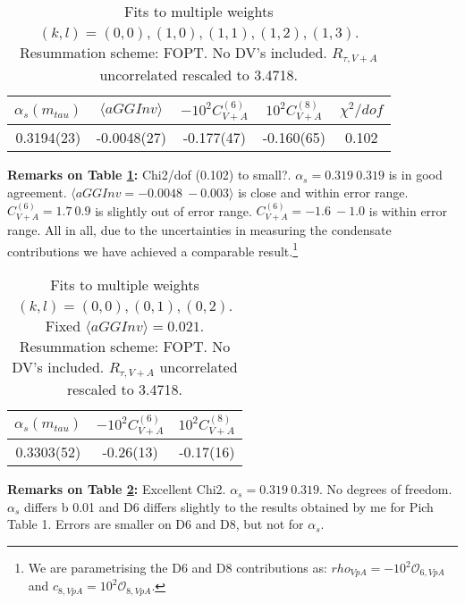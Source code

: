 \documentclass[12pt]{article}
\begin{document}
\begin{table}
  \centering
  \begin{tabular}{ | c c c c c | }
    \hline
    $\alpha_s(m_{tau})$ & $\langle aGGInv \rangle$ & $-10^2 C_{V+A}^{(6)}$ & $10^2 C_{V+A}^{(8)}$ & $\chi^2/dof$ \\ 
    \hline
    0.3194(23) & -0.0048(27) & -0.177(47) & -0.160(65) & 0.102 \\ 
    \hline
  \end{tabular}
  \caption{
    Fits to multiple weights $(k, l) = {(0,0), (1,0), (1,1), (1,2), (1,3)}$.
    Resummation scheme: FOPT. No DV's included.
    $R_{\tau, V+A}$ uncorrelated rescaled to 3.4718.
  }
  \label{table:pich2016Table1}
\end{table}
\textbf{Remarks on Table \ref{table:pich2016Table1}:} Chi2/dof (0.102) to small?. $\alpha_s
= 0.319 ~ 0.319$
is in good agreement. $\langle aGGInv = -0.0048 ~ -0.003 \rangle$ is close and
within error range. $C_{V+A}^{(6)} = 1.7 ~ 0.9$ is slightly out of error range.
$C_{V+A}^{(6)} = -1.6 ~ -1.0$ is within error range. All in all, due to the
uncertainties in measuring the condensate contributions we have achieved a
comparable result.\footnote{We are parametrising the D6 and D8 contributions as: $rho_{VpA} = - 10^2 \mathcal{O}_{6,
      VpA}$ and $c_{8, VpA} = 10^2 \mathcal{O}_{8, VpA}$.}

\begin{table}
  \centering
  \begin{tabular}{ | c c c | }
    \hline
    $\alpha_s(m_{tau})$ & $-10^2 C_{V+A}^{(6)}$ & $10^2 C_{V+A}^{(8)}$ \\ 
    \hline
    0.3303(52) & -0.26(13) & -0.17(16) \\ 
    \hline
  \end{tabular}
  \caption{
    Fits to multiple weights $(k, l) = {(0,0), (0,1), (0,2)}$.
    Fixed $\langle  aGGInv \rangle = 0.021$.
    Resummation scheme: FOPT. No DV's included.
    $R_{\tau, V+A}$ uncorrelated rescaled to 3.4718.
  }
  \label{table:sTauW00W01W02}
\end{table}
\textbf{Remarks on Table \ref{table:sTauW00W01W02}:} Excellent Chi2. $\alpha_s
= 0.319 ~ 0.319$. No degrees of freedom. $\alpha_s$ differs b 0.01 and D6
differs slightly to the results obtained by me for Pich Table 1. Errors are
smaller on D6 and D8, but not for $\alpha_s$.
\end{document}
